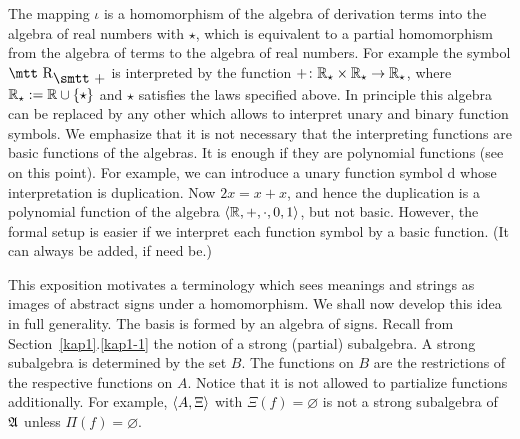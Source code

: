 The mapping $\iota$ is a homomorphism of the algebra of derivation
terms into the algebra of real numbers with $\star$, which is
equivalent to a partial homomorphism from the algebra of terms to
the algebra of real numbers. For example the symbol $\mbox{\mtt
R}_{\mbox{\smtt +}}$ is interpreted by the function $+ \colon
\mathbb{R}_{\star}\times\mathbb{R}_{\star} \rightarrow \mathbb{R}_{\star}$, where $\mathbb{R}_{\star}
:= \mathbb{R} \cup \{\star\}$ and $\star$ satisfies the laws specified
above. In principle this algebra can be replaced by any other
which allows to interpret unary and binary function symbols. We
emphasize that it is not necessary that the interpreting
functions are basic functions of the algebras.  It is enough 
if they are polynomial functions (see \cite{hendriks:compositionality} 
on this point). For example, we can introduce a 
unary function symbol {\mtt d} whose interpretation is
duplication. Now $2x = x + x$, and hence the duplication is a
polynomial function of the algebra $\langle \mathbb{R}, +, \cdot, 0, 1\rangle$,
but not basic. However, the formal setup is easier if we interpret 
each function symbol by a basic function. (It can always be added, 
if need be.)

This exposition motivates a terminology which sees meanings and
strings as images of abstract signs under a homomorphism. We shall
now develop this idea in full generality. The basis is formed by
an algebra of signs. Recall from Section~\ref{kap1}.\ref{kap1-1} the notion 
of a strong (partial) subalgebra. A strong subalgebra is determined 
by the set $B$. The functions on $B$ are the restrictions of the 
respective functions on $A$. Notice that it is not allowed to 
partialize functions additionally. For example, $\langle A, \Xi\rangle$ 
with $\Xi(f) = \varnothing$ is not a strong subalgebra of $\mathfrak{A}$ 
unless $\Pi(f) = \varnothing$.

